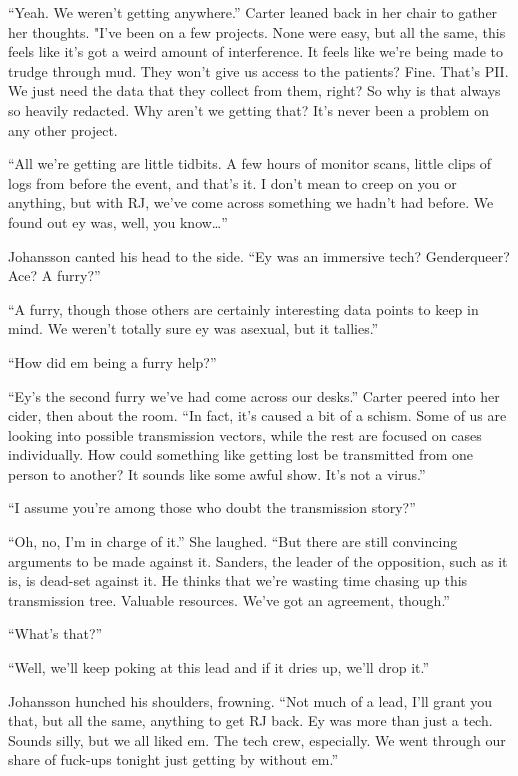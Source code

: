 ``Yeah. We weren't getting anywhere.'' Carter leaned back in her chair to gather her thoughts. "I've been on a few projects. None were easy, but all the same, this feels like it's got a weird amount of interference. It feels like we're being made to trudge through mud. They won't give us access to the patients? Fine. That's PII. We just need the data that they collect from them, right? So why is that always so heavily redacted. Why aren't we getting that? It's never been a problem on any other project.

``All we're getting are little tidbits. A few hours of monitor scans, little clips of logs from before the event, and that's it. I don't mean to creep on you or anything, but with RJ, we've come across something we hadn't had before. We found out ey was, well, you know\ldots{}''

Johansson canted his head to the side. ``Ey was an immersive tech? Genderqueer? Ace? A furry?''

``A furry, though those others are certainly interesting data points to keep in mind. We weren't totally sure ey was asexual, but it tallies.''

``How did em being a furry help?''

``Ey's the second furry we've had come across our desks.'' Carter peered into her cider, then about the room. ``In fact, it's caused a bit of a schism. Some of us are looking into possible transmission vectors, while the rest are focused on cases individually. How could something like getting lost be transmitted from one person to another? It sounds like some awful show. It's not a virus.''

``I assume you're among those who doubt the transmission story?''

``Oh, no, I'm in charge of it.'' She laughed. ``But there are still convincing arguments to be made against it. Sanders, the leader of the opposition, such as it is, is dead-set against it. He thinks that we're wasting time chasing up this transmission tree. Valuable resources. We've got an agreement, though.''

``What's that?''

``Well, we'll keep poking at this lead and if it dries up, we'll drop it.''

Johansson hunched his shoulders, frowning. ``Not much of a lead, I'll grant you that, but all the same, anything to get RJ back. Ey was more than just a tech. Sounds silly, but we all liked em. The tech crew, especially. We went through our share of fuck-ups tonight just getting by without em.''

